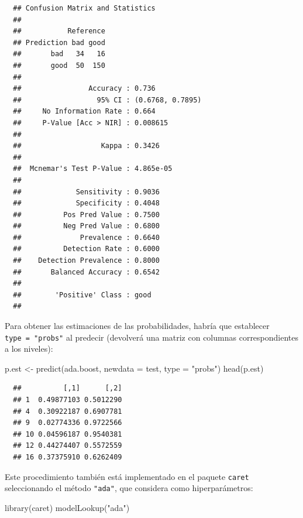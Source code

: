 \documentclass[
]{book}
\newenvironment{Shaded}{\begin{snugshade}}{\end{snugshade}}
\newcommand{\AttributeTok}[1]{\textcolor[rgb]{0.77,0.63,0.00}{#1}}
\newcommand{\FunctionTok}[1]{\textcolor[rgb]{0.00,0.00,0.00}{#1}}
\newcommand{\NormalTok}[1]{#1}
\newcommand{\OtherTok}[1]{\textcolor[rgb]{0.56,0.35,0.01}{#1}}
\newcommand{\StringTok}[1]{\textcolor[rgb]{0.31,0.60,0.02}{#1}}
\theoremstyle{break}
\theoremstyle{nonumberplain}
\begin{document}
\begin{verbatim}
  ## Confusion Matrix and Statistics
  ## 
  ##           Reference
  ## Prediction bad good
  ##       bad   34   16
  ##       good  50  150
  ##                                           
  ##                Accuracy : 0.736           
  ##                  95% CI : (0.6768, 0.7895)
  ##     No Information Rate : 0.664           
  ##     P-Value [Acc > NIR] : 0.008615        
  ##                                           
  ##                   Kappa : 0.3426          
  ##                                           
  ##  Mcnemar's Test P-Value : 4.865e-05       
  ##                                           
  ##             Sensitivity : 0.9036          
  ##             Specificity : 0.4048          
  ##          Pos Pred Value : 0.7500          
  ##          Neg Pred Value : 0.6800          
  ##              Prevalence : 0.6640          
  ##          Detection Rate : 0.6000          
  ##    Detection Prevalence : 0.8000          
  ##       Balanced Accuracy : 0.6542          
  ##                                           
  ##        'Positive' Class : good            
  ## 
\end{verbatim}

Para obtener las estimaciones de las probabilidades, habría que establecer \texttt{type\ =\ "probs"} al predecir (devolverá una matriz con columnas correspondientes a los niveles):

\begin{Shaded}
\begin{Highlighting}[]
\NormalTok{p.est }\OtherTok{\textless{}{-}} \FunctionTok{predict}\NormalTok{(ada.boost, }\AttributeTok{newdata =}\NormalTok{ test, }\AttributeTok{type =} \StringTok{"probs"}\NormalTok{)}
\FunctionTok{head}\NormalTok{(p.est)}
\end{Highlighting}
\end{Shaded}

\begin{verbatim}
  ##          [,1]      [,2]
  ## 1  0.49877103 0.5012290
  ## 4  0.30922187 0.6907781
  ## 9  0.02774336 0.9722566
  ## 10 0.04596187 0.9540381
  ## 12 0.44274407 0.5572559
  ## 16 0.37375910 0.6262409
\end{verbatim}

Este procedimiento también está implementado en el paquete \texttt{caret} seleccionando el método \texttt{"ada"}, que considera como hiperparámetros:

\begin{Shaded}
\begin{Highlighting}[]
\FunctionTok{library}\NormalTok{(caret)}
\FunctionTok{modelLookup}\NormalTok{(}\StringTok{"ada"}\NormalTok{)}
\end{Highlighting}
\end{Shaded}
\end{document}
